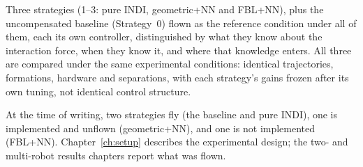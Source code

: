Three strategies (1--3: pure INDI, geometric+NN and FBL+NN), plus the uncompensated baseline
(Strategy~0) flown as the reference condition under all of them, each its own controller,
distinguished by what they know about the interaction force, when they know it, and where that
knowledge enters. All three are compared under the same experimental conditions: identical
trajectories, formations, hardware and separations, with each strategy's gains frozen after its own
tuning, not identical control structure.

At the time of writing, two strategies fly (the baseline and pure INDI), one is implemented and
unflown (geometric+NN), and one is not implemented (FBL+NN). Chapter~\ref{ch:setup} describes the experimental
design; the two- and multi-robot results chapters report what was flown.
